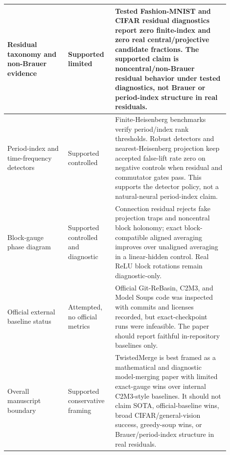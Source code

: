 \begin{table}[t]
\begin{tabular}{p{0.25\linewidth}p{0.18\linewidth}p{0.47\linewidth}}
\hline
Residual taxonomy and non-Brauer evidence & Supported limited & Tested Fashion-MNIST and CIFAR residual diagnostics report zero finite-index and zero real central/projective candidate fractions. The supported claim is noncentral/non-Brauer residual behavior under tested diagnostics, not Brauer or period-index structure in real residuals. \\
\hline
Period-index and time-frequency detectors & Supported controlled & Finite-Heisenberg benchmarks verify period/index rank thresholds. Robust detectors and nearest-Heisenberg projection keep accepted false-lift rate zero on negative controls when residual and commutator gates pass. This supports the detector policy, not a natural-neural period-index claim. \\
\hline
Block-gauge phase diagram & Supported controlled and diagnostic & Connection residual rejects fake projection traps and noncentral block holonomy; exact block-compatible aligned averaging improves over unaligned averaging in a linear-hidden control. Real ReLU block rotations remain diagnostic-only. \\
\hline
Official external baseline status & Attempted, no official metrics & Official Git-ReBasin, C2M3, and Model Soups code was inspected with commits and licenses recorded, but exact-checkpoint runs were infeasible. The paper should report faithful in-repository baselines only. \\
\hline
Overall manuscript boundary & Supported conservative framing & TwistedMerge is best framed as a mathematical and diagnostic model-merging paper with limited exact-gauge wins over internal C2M3-style baselines. It should not claim SOTA, official-baseline wins, broad CIFAR/general-vision success, greedy-soup wins, or Brauer/period-index structure in real residuals. \\
\hline
\end{tabular}
\end{table}
